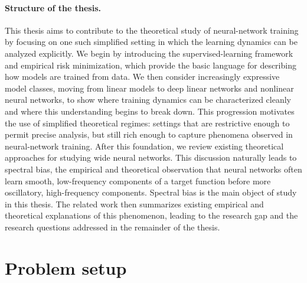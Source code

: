 \paragraph{Structure of the thesis.}
This thesis aims to contribute to the theoretical study of neural-network
training by focusing on one such simplified setting in which the learning dynamics can
be analyzed explicitly. We begin by introducing the supervised-learning
framework and empirical risk minimization, which provide the basic language for
describing how models are trained from data. We then consider increasingly
expressive model classes, moving from linear models to deep linear networks and
nonlinear neural networks, to show where training dynamics can be characterized
cleanly and where this understanding begins to break down. This progression
motivates the use of simplified theoretical regimes: settings that are
restrictive enough to permit precise analysis, but still rich enough to capture
phenomena observed in neural-network training. After this foundation, we review
existing theoretical approaches for studying wide neural networks. This
discussion naturally leads to spectral bias, the empirical and theoretical
observation that neural networks often learn smooth, low-frequency components
of a target function before more oscillatory, high-frequency components.
Spectral bias is the main object of study in this thesis. The related work then
summarizes existing empirical and theoretical explanations of this phenomenon,
leading to the research gap and the research questions addressed in the
remainder of the thesis.

\section{Problem setup}

